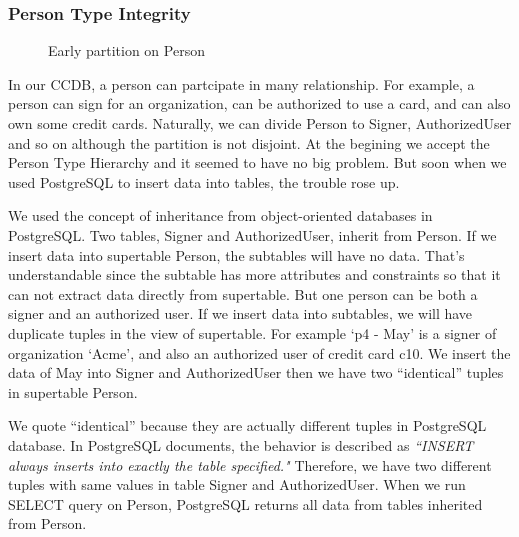 \documentclass[11pt]{article}
\begin{document}
\subsubsection{Person Type Integrity}

\begin{figure}
\centering
{}
\caption{Early partition on Person}
\end{figure}

\par
In our CCDB, a person can partcipate in many relationship. For example, a person can sign for an organization, can be authorized to use a card, and can also own some credit cards. Naturally, we can divide Person to Signer, AuthorizedUser and so on although the partition is not disjoint. At the begining we accept the Person Type Hierarchy and it seemed to have no big problem. But soon when we used PostgreSQL to insert data into tables, the trouble rose up.

\par
We used the concept of inheritance from object-oriented databases in PostgreSQL. Two tables, Signer and AuthorizedUser, inherit from Person. If we insert data into supertable Person, the subtables will have no data. That's understandable since the subtable has more attributes and constraints so that it can not extract data directly from supertable. But one person can be both a signer and an authorized user. If we insert data into subtables, we will have duplicate tuples in the view of supertable. For example `p4 - May' is a signer of organization `Acme', and also an authorized user of credit card c10. We insert the data of May into Signer and AuthorizedUser then we have two ``identical'' tuples in supertable Person.

\par
We quote ``identical'' because they are actually different tuples in PostgreSQL database. In PostgreSQL documents, the behavior is described as \emph{``INSERT always inserts into exactly the table specified."} Therefore, we have two different tuples with same values in table Signer and AuthorizedUser. When we run SELECT query on Person, PostgreSQL returns all data from tables inherited from Person.
\end{document}
